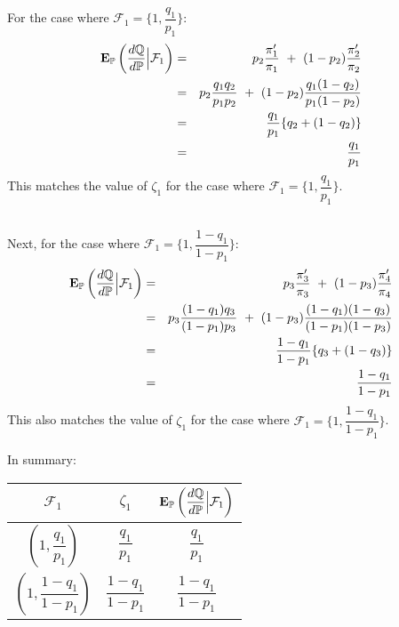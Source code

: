 \documentclass[uplatex,a4j,12pt,dvipdfmx]{jsarticle}
\begin{document}
For the case where $\mathcal{F}_{1} = \Big\{ 1 , \dfrac{q_{1}}{p_{1}} \Big\} $:
%
\begin{eqnarray*}
	{\bf E}_{\mathbb{P}}
	\left( \dfrac{ d \mathbb{Q} }{ d \mathbb{P} } \Big| \mathcal{F}_{1} \right)
	&=&
	p_{2} \dfrac{ \pi'_{1} }{ \pi_{1} }
	\ + \
	(1-p_{2}) \dfrac{ \pi'_{2} }{ \pi_{2} }
	\\ &=&
	p_{2} \dfrac{ q_{1} q_{2} }{ p_{1} p_{2} }
	\ + \
	(1-p_{2}) \dfrac{ q_{1} (1-q_{2}) }{ p_{1} (1-p_{2}) }
	\\ &=&
	\dfrac{ q_{1} }{ p_{1} }
	\{ q_{2} + (1-q_{2}) \}
	\\ &=&
	\dfrac{ q_{1} }{ p_{1} }
\end{eqnarray*}
%
This matches the value of $\zeta_{1}$ for the case where $\mathcal{F}_{1} = \Big\{ 1 , \dfrac{q_{1}}{p_{1}} \Big\} $.

${}$

Next, for the case where $\mathcal{F}_{1} = \Big\{ 1 , \dfrac{1-q_{1}}{1-p_{1}} \Big\} $:
%
\begin{eqnarray*}
	{\bf E}_{\mathbb{P}}
	\left( \dfrac{ d \mathbb{Q} }{ d \mathbb{P} } \Big| \mathcal{F}_{1} \right)
	&=&
	p_{3} \dfrac{ \pi'_{3} }{ \pi_{3} }
	\ + \
	(1-p_{3}) \dfrac{ \pi'_{4} }{ \pi_{4} }
	\\ &=&
	p_{3} \dfrac{ (1-q_{1}) q_{3} }{ (1-p_{1}) p_{3} }
	\ + \
	(1-p_{3}) \dfrac{ (1-q_{1}) (1-q_{3}) }{ (1-p_{1}) (1-p_{3}) }
	\\ &=&
	\dfrac{1-q_{1}}{ 1-p_{1}}
	\{ q_{3} + (1-q_{3}) \}
	\\ &=&
	\dfrac{1-q_{1}}{ 1-p_{1}}
\end{eqnarray*}
%
This also matches the value of $\zeta_{1}$ for the case where $\mathcal{F}_{1} = \Big\{ 1 , \dfrac{1-q_{1}}{1-p_{1}} \Big\} $.

In summary:

\begin{center}
	\begin{tabular}{|c|c|c|} \hline
		$\mathcal{F}_{1}$                 & $\zeta_{1}$                & ${\bf E}_{\mathbb{P}} \left( \dfrac{ d \mathbb{Q} }{ d \mathbb{P} } \Big| \mathcal{F}_{1} \right)$ \\ \hline \hline
		$(1 , \dfrac{q_{1}}{p_{1}} )$     & $\dfrac{q_{1}}{p_{1}}$     & $\dfrac{q_{1}}{p_{1}}$                                                                             \\ \hline
		$(1 , \dfrac{1-q_{1}}{1-p_{1}} )$ & $\dfrac{1-q_{1}}{1-p_{1}}$ & $\dfrac{1-q_{1}}{1-p_{1}}$                                                                         \\ \hline
	\end{tabular}
\end{center}
\end{document}
